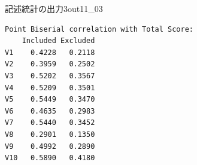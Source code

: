 \begin{Rscreen}{記述統計の出力3}{out11_03}
	\begin{verbatim}
Point Biserial correlation with Total Score:
    Included Excluded
V1    0.4228   0.2118
V2    0.3959   0.2502
V3    0.5202   0.3567
V4    0.5209   0.3501
V5    0.5449   0.3470
V6    0.4635   0.2983
V7    0.5440   0.3452
V8    0.2901   0.1350
V9    0.4992   0.2890
V10   0.5890   0.4180
    \end{verbatim}
\end{Rscreen}
